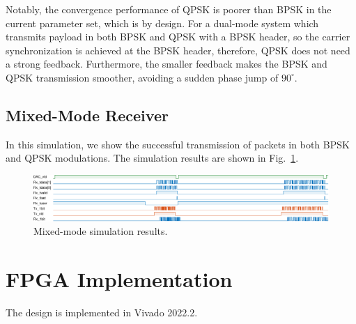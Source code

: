 \documentclass[journal,twoside]{IEEEtran}
\begin{document}
      Notably, the convergence performance of QPSK is poorer than BPSK in the current parameter set,
      which is by design.
      For a dual-mode system which transmits payload in both BPSK and QPSK with a BPSK header,
      so the carrier synchronization is achieved at the BPSK header,
      therefore, QPSK does not need a strong feedback.
      Furthermore, the smaller feedback makes the BPSK and QPSK transmission smoother,
      avoiding a sudden phase jump of $90^\circ$.

    \subsection{Mixed-Mode Receiver}

      In this simulation, we show the successful transmission of packets in both BPSK and QPSK modulations.
      The simulation results are shown in Fig.~\ref{fig:mix_sim}.
      \begin{figure}
        \includegraphics{_tikz_sim_MIX-crop.pdf}
        \caption{Mixed-mode simulation results.}
        \label{fig:mix_sim}
      \end{figure}

  \section{FPGA Implementation}

    The design is implemented in Vivado 2022.2.
\end{document}
